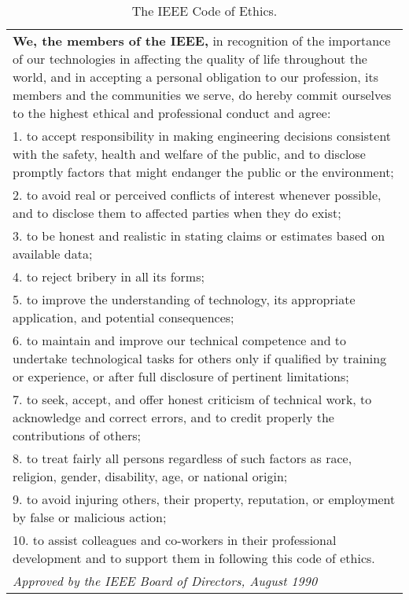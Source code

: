 \begin{table}
\caption{ The IEEE Code of Ethics.}
\label{table:IEEEcodeOfEthics}
\begin{tabular}{|m{15cm}|}
\hline

\textbf{We, the members of the IEEE,} in recognition of the importance
of our technologies in affecting the quality of life throughout the
world, and in accepting a personal obligation to our profession, its
members and the communities we serve, do hereby commit ourselves to the
highest ethical and professional conduct and agree:\\

1. to accept responsibility in making engineering decisions consistent
with the safety, health and welfare of the public, and to disclose
promptly factors that might endanger the public or the environment;\\

2. to avoid real or perceived conflicts of interest whenever possible,
and to disclose them to affected parties when they do exist;\\

3. to be honest and realistic in stating claims or estimates based on
available data;\\

4. to reject bribery in all its forms;\\

5. to improve the understanding of technology, its appropriate
application, and potential consequences;\\

6. to maintain and improve our technical competence and to undertake
technological tasks for others only if qualified by training or
experience, or after full disclosure of pertinent limitations;\\

7. to seek, accept, and offer honest criticism of technical work, to
acknowledge and correct errors, and to credit properly the contributions
of others;\\

8. to treat fairly all persons regardless of such factors as race,
religion, gender, disability, age, or national origin;\\

9. to avoid injuring others, their property, reputation, or employment
by false or malicious action;\\

10. to assist colleagues and co-workers in their professional
development and to support them in following this code of ethics.\\

\emph{Approved by the IEEE Board of Directors, August 1990}
\end{tabular}
\end{table}

